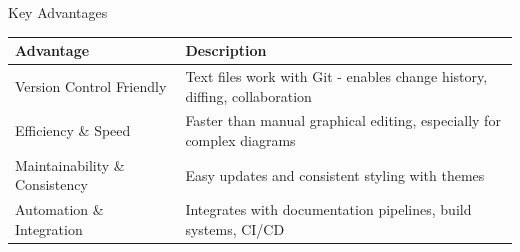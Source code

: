 \documentclass{beamer}
\begin{document}
\begin{frame}[t]{Key Advantages}
    \begin{table}
    \small
    \begin{tabular}{p{} p{}}
    \textbf{Advantage} & \textbf{Description} \\
    \hline
    Version Control Friendly & Text files work with Git - enables change history, diffing, collaboration \\
    Efficiency \& Speed & Faster than manual graphical editing, especially for complex diagrams \\
    Maintainability \& Consistency & Easy updates and consistent styling with themes \\
    Automation \& Integration & Integrates with documentation pipelines, build systems, CI/CD \\
    \end{tabular}
    \end{table}
\end{frame}
\end{document}
